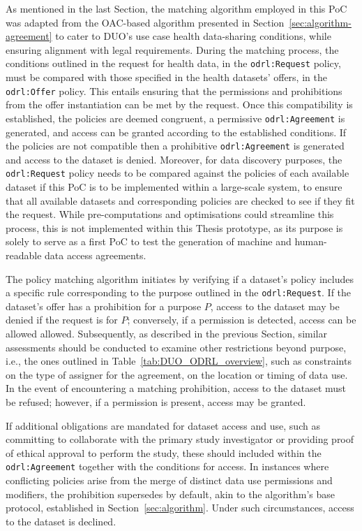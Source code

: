As mentioned in the last Section, the matching algorithm employed in this PoC was adapted from the OAC-based algorithm presented in Section~\ref{sec:algorithm-agreement} to cater to DUO's use case health data-sharing conditions, while ensuring alignment with legal requirements.
During the matching process, the conditions outlined in the request for health data, in the \texttt{odrl:Request} policy, must be compared with those specified in the health datasets' offers, in the \texttt{odrl:Offer} policy.
This entails ensuring that the permissions and prohibitions from the offer instantiation can be met by the request.
Once this compatibility is established, the policies are deemed congruent, a permissive \texttt{odrl:Agreement} is generated, and access can be granted according to the established conditions.
If the policies are not compatible then a prohibitive \texttt{odrl:Agreement} is generated and access to the dataset is denied.
Moreover, for data discovery purposes, the \texttt{odrl:Request} policy needs to be compared against the policies of each available dataset if this PoC is to be implemented within a large-scale system, to ensure that all available datasets and corresponding policies are checked to see if they fit the request.
While pre-computations and optimisations could streamline this process, this is not implemented within this Thesis prototype, as its purpose is solely to serve as a first PoC to test the generation of machine and human-readable data access agreements.

The policy matching algorithm initiates by verifying if a dataset's policy includes a specific rule corresponding to the purpose outlined in the \texttt{odrl:Request}. 
If the dataset's offer has a prohibition for a purpose $P$, access to the dataset may be denied if the request is for $P$; conversely, if a permission is detected, access can be allowed allowed.
Subsequently, as described in the previous Section, similar assessments should be conducted to examine other restrictions beyond purpose, i.e., the ones outlined in Table~\ref{tab:DUO_ODRL_overview}, such as constraints on the type of assigner for the agreement, on the location or timing of data use.
In the event of encountering a matching prohibition, access to the dataset must be refused; however, if a permission is present, access may be granted.

If additional obligations are mandated for dataset access and use, such as committing to collaborate with the primary study investigator or providing proof of ethical approval to perform the study, these should included within the \texttt{odrl:Agreement} together with the conditions for access.
In instances where conflicting policies arise from the merge of distinct data use permissions and modifiers, the prohibition supersedes by default, akin to the algorithm's base protocol, established in Section~\ref{sec:algorithm}.
Under such circumstances, access to the dataset is declined.

